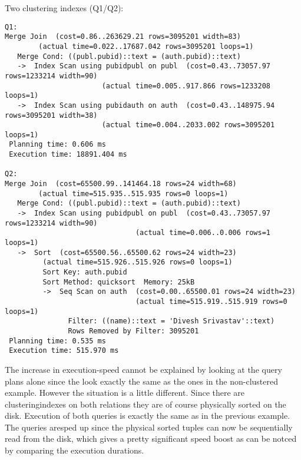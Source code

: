 \documentclass[11pt]{scrartcl}
\begin{document}
\noindent Two clustering indexes  (Q1/Q2):
{\small
\begin{verbatim}
Q1:
Merge Join  (cost=0.86..263629.21 rows=3095201 width=83) 
	    (actual time=0.022..17687.042 rows=3095201 loops=1)
   Merge Cond: ((publ.pubid)::text = (auth.pubid)::text)
   ->  Index Scan using pubidpubl on publ  (cost=0.43..73057.97 rows=1233214 width=90) 
					   (actual time=0.005..917.866 rows=1233208 loops=1)
   ->  Index Scan using pubidauth on auth  (cost=0.43..148975.94 rows=3095201 width=38) 
					   (actual time=0.004..2033.002 rows=3095201 loops=1)
 Planning time: 0.606 ms
 Execution time: 18891.404 ms

Q2:
Merge Join  (cost=65500.99..141464.18 rows=24 width=68) 
	    (actual time=515.935..515.935 rows=0 loops=1)
   Merge Cond: ((publ.pubid)::text = (auth.pubid)::text)
   ->  Index Scan using pubidpubl on publ  (cost=0.43..73057.97 rows=1233214 width=90) 
    				           (actual time=0.006..0.006 rows=1 loops=1)
   ->  Sort  (cost=65500.56..65500.62 rows=24 width=23) 
	     (actual time=515.926..515.926 rows=0 loops=1)
         Sort Key: auth.pubid
         Sort Method: quicksort  Memory: 25kB
         ->  Seq Scan on auth  (cost=0.00..65500.01 rows=24 width=23) 
                               (actual time=515.919..515.919 rows=0 loops=1)
               Filter: ((name)::text = 'Divesh Srivastav'::text)
               Rows Removed by Filter: 3095201
 Planning time: 0.535 ms
 Execution time: 515.970 ms
\end{verbatim}
The increase in execution-speed cannot be explained by looking at the query plans alone since the look exactly the same as the ones in the non-clustered example. However the situation is a little different.
Since there are clusteringindexes on both relations they are of course physically sorted on the disk. Execution of both queries is exactly the same as in the previous example.
The queries aresped up since the physical sorted tuples can now be sequentially read from the disk, which gives a pretty significant speed boost as can be notced by comparing the execution durations.
}
\end{document}
